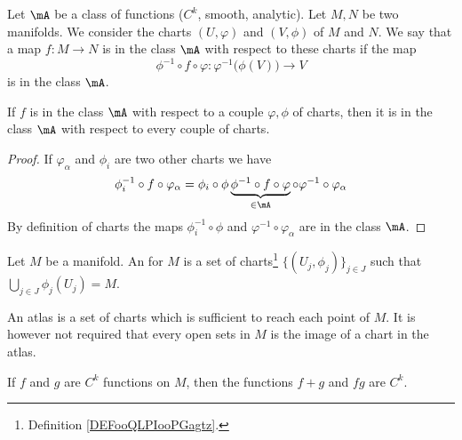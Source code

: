 \begin{propositionDef}     \label{PROPooUFGQooACIjVL}
	Let \( \mA\) be a class of functions (\( C^k\), smooth, analytic). Let \( M,N\) be two manifolds. We consider the charts \( (U,\varphi)\) and \( (V,\phi)\) of \( M\) and \( N\). We say that a map \(f\colon M\to N \) is in the class \( \mA\) with respect to these charts if the map
	\begin{equation}
		\phi^{-1}\circ f\circ\varphi\colon \varphi^{-1}\big( \phi(V) \big)\to V
	\end{equation}
	is in the class \( \mA\).

	If \( f\) is in the class \( \mA\) with respect to a couple \( \varphi,\phi\) of charts, then it is in the class \( \mA\) with respect to every couple of charts.
\end{propositionDef}

\begin{proof}
	If \( \varphi_{\alpha}\) and \( \phi_i\) are two other charts we have
	\begin{equation}
		\phi_i^{-1}\circ f\circ \varphi_{\alpha}=\phi_i\circ\phi\underbrace{\phi^{-1}\circ f\circ \varphi}_{\in \mA}\circ\varphi^{-1}\circ\varphi_{\alpha}
	\end{equation}
	By definition of charts the maps \( \phi_i^{-1}\circ\phi\) and \( \varphi^{-1}\circ\varphi_{\alpha}\) are in the class \( \mA\).
\end{proof}


\begin{definition}       \label{DEFooMLNQooEgEfdq}
	Let \( M\) be a manifold. An  for \( M\) is a set of charts\footnote{Definition \ref{DEFooQLPIooPGagtz}.} \( \{  (U_j,\phi_j)  \}_{j\in J}\) such that \( \bigcup_{j\in J}\phi_j(U_j)=M\).
\end{definition}

\begin{normaltext}
	An atlas is a set of charts which is sufficient to reach each point of \( M\). It is however not required that every open sets in \( M\) is the image of a chart in the atlas.
\end{normaltext}


\begin{proposition}		\label{PROPooCWPAooKDnwHR}
	If \( f\) and \( g\) are \( C^k\) functions on \( M\), then the functions \( f+g\) and \( fg\) are \( C^k\).
\end{proposition}

